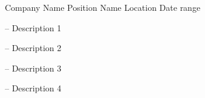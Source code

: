 \vspace{-12mm} %
\begin{cventries}

  \cventry
    {Company Name} %
    {Position Name} %
    {Location} %
    {Date range} %
    {
      \begin{cvitems} %
        \item[--] Description 1
        \item[--] Description 2
        \item[--] Description 3
        \item[--] Description 4
      \end{cvitems}
    }
\end{cventries}